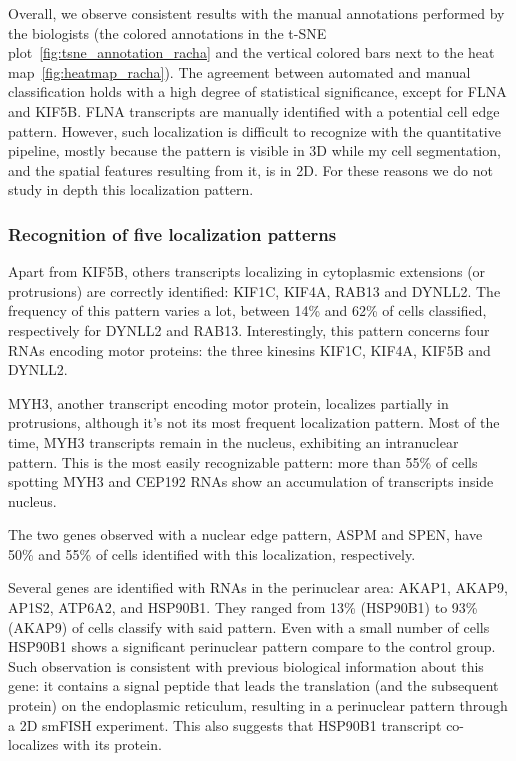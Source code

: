 Overall, we observe consistent results with the manual annotations performed by the biologists (the colored annotations in the \ac{t-SNE} plot~\ref{fig:tsne_annotation_racha} and the vertical colored bars next to the heat map~\ref{fig:heatmap_racha}).
The agreement between automated and manual classification holds with a high degree of statistical significance, except for FLNA and KIF5B.
FLNA transcripts are manually identified with a potential cell edge pattern.
However, such localization is difficult to recognize with the quantitative pipeline, mostly because the pattern is visible in 3D while my cell segmentation, and the spatial features resulting from it, is in 2D.
For these reasons we do not study in depth this localization pattern.

\subsubsection{Recognition of five localization patterns}

Apart from KIF5B, others transcripts localizing in cytoplasmic extensions (or protrusions) are correctly identified: KIF1C, KIF4A, RAB13 and DYNLL2.
The frequency of this pattern varies a lot, between 14\% and 62\% of cells classified, respectively for DYNLL2 and RAB13.
Interestingly, this pattern concerns four \ac{RNA}s encoding motor proteins: the three kinesins KIF1C, KIF4A, KIF5B and DYNLL2.

MYH3, another transcript encoding motor protein, localizes partially in protrusions, although it's not its most frequent localization pattern.
Most of the time, MYH3 transcripts remain in the nucleus, exhibiting an intranuclear pattern.
This is the most easily recognizable pattern: more than 55\% of cells spotting MYH3 and CEP192 \ac{RNA}s show an accumulation of transcripts inside nucleus.

The two genes observed with a nuclear edge pattern, ASPM and SPEN, have 50\% and 55\% of cells identified with this localization, respectively.

Several genes are identified with \ac{RNA}s in the perinuclear area: AKAP1, AKAP9, AP1S2, ATP6A2, and HSP90B1.
They ranged from 13\% (HSP90B1) to 93\% (AKAP9) of cells classify with said pattern.
Even with a small number of cells HSP90B1 shows a significant perinuclear pattern compare to the control group.
Such observation is consistent with previous biological information about this gene: it contains a signal peptide that leads the translation (and the subsequent protein) on the endoplasmic reticulum, resulting in a perinuclear pattern through a 2D \ac{smFISH} experiment.
This also suggests that HSP90B1 transcript co-localizes with its protein.


